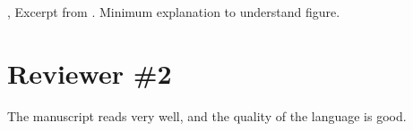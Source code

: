 \begin{refsegment}
{\begin{rfigure}[H]
  \centering
  {\label{rfig:wow}}
  \caption{, Excerpt from . Minimum
    explanation to understand figure.}
\end{rfigure}

}

\section{Reviewer \#2}

\RC The manuscript reads very well, and the quality of the language is good.


\end{refsegment}

\printbibliography[segment=2]


